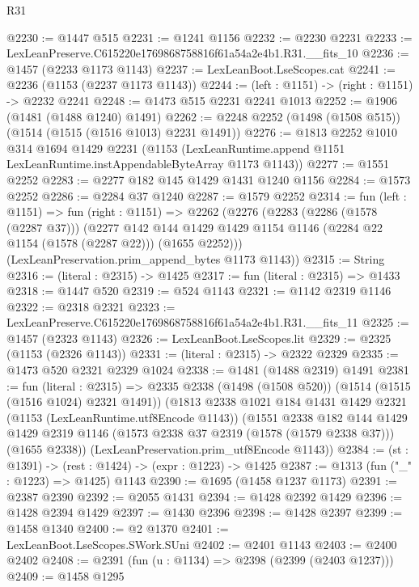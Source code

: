 \begin{lexlean}{R31}
\begin{coremodule}
@2230 := @1447 @515
@2231 := @1241 @1156
@2232 := @2230 @2231
@2233 := LexLeanPreserve.C615220e1769868758816f61a54a2e4b1.R31.__fits_10
@2236 := @1457 (@2233 @1173 @1143)
@2237 := LexLeanBoot.LseScopes.cat
@2241 := @2236 (@1153 (@2237 @1173 @1143))
@2244 := (left : @1151) -> (right : @1151) -> @2232 @2241
@2248 := @1473 @515 @2231 @2241 @1013
@2252 := @1906 (@1481 (@1488 @1240) @1491)
@2262 := @2248 @2252 (@1498 (@1508 @515)) (@1514 (@1515 (@1516 @1013) @2231 @1491))
@2276 := @1813
    @2252
    @1010
    @314
    @1694
    @1429
    @2231
    (@1153 (LexLeanRuntime.append @1151 LexLeanRuntime.instAppendableByteArray @1173 @1143))
@2277 := @1551 @2252
@2283 := @2277 @182 @145 @1429 @1431 @1240 @1156
@2284 := @1573 @2252
@2286 := @2284 @37 @1240
@2287 := @1579 @2252
@2314 := fun (left : @1151) =>
  fun (right : @1151) =>
  @2262
    (@2276
      (@2283
        (@2286 (@1578 (@2287 @37)))
        (@2277
          @142
          @144
          @1429
          @1429
          @1154
          @1146
          (@2284 @22 @1154 (@1578 (@2287 @22)))
          (@1655 @2252)))
      (LexLeanPreservation.prim_append_bytes @1173 @1143))
@2315 := String
@2316 := (literal : @2315) -> @1425
@2317 := fun (literal : @2315) => @1433
@2318 := @1447 @520
@2319 := @524 @1143
@2321 := @1142 @2319 @1146
@2322 := @2318 @2321
@2323 := LexLeanPreserve.C615220e1769868758816f61a54a2e4b1.R31.__fits_11
@2325 := @1457 (@2323 @1143)
@2326 := LexLeanBoot.LseScopes.lit
@2329 := @2325 (@1153 (@2326 @1143))
@2331 := (literal : @2315) -> @2322 @2329
@2335 := @1473 @520 @2321 @2329 @1024
@2338 := @1481 (@1488 @2319) @1491
@2381 := fun (literal : @2315) =>
  @2335
    @2338
    (@1498 (@1508 @520))
    (@1514 (@1515 (@1516 @1024) @2321 @1491))
    (@1813
      @2338
      @1021
      @184
      @1431
      @1429
      @2321
      (@1153 (LexLeanRuntime.utf8Encode @1143))
      (@1551
        @2338
        @182
        @144
        @1429
        @1429
        @2319
        @1146
        (@1573 @2338 @37 @2319 (@1578 (@1579 @2338 @37)))
        (@1655 @2338))
      (LexLeanPreservation.prim_utf8Encode @1143))
@2384 := (st : @1391) -> (rest : @1424) -> (expr : @1223) -> @1425
@2387 := @1313 (fun ("_" : @1223) => @1425) @1143
@2390 := @1695 (@1458 @1237 @1173)
@2391 := @2387 @2390
@2392 := @2055 @1431
@2394 := @1428 @2392 @1429
@2396 := @1428 @2394 @1429
@2397 := @1430 @2396
@2398 := @1428 @2397
@2399 := @1458 @1340
@2400 := @2 @1370
@2401 := LexLeanBoot.LseScopes.SWork.SUni
@2402 := @2401 @1143
@2403 := @2400 @2402
@2408 := @2391 (fun (u : @1134) => @2398 (@2399 (@2403 @1237)))
@2409 := @1458 @1295

\end{coremodule}
\end{lexlean}
